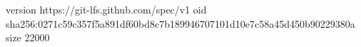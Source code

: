 version https://git-lfs.github.com/spec/v1
oid sha256:0271c59c357f5a891df60bd8c7b189946707101d10e7c58a45d450b90229380a
size 22000
